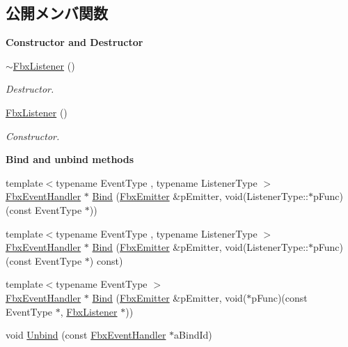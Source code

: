 \subsection*{公開メンバ関数}
\begin{Indent}\textbf{ Constructor and Destructor}\par
\begin{DoxyCompactItemize}
\item 
\hyperlink{class_fbx_listener_a47f9225b672464b671e7d260fba28fa3}{$\sim$\+Fbx\+Listener} ()
\begin{DoxyCompactList}\small\item\em Destructor. \end{DoxyCompactList}\item 
\hyperlink{class_fbx_listener_a8d0059633c0a29709abd105fb4f911ec}{Fbx\+Listener} ()
\begin{DoxyCompactList}\small\item\em Constructor. \end{DoxyCompactList}\end{DoxyCompactItemize}
\end{Indent}
\begin{Indent}\textbf{ Bind and unbind methods}\par
\begin{DoxyCompactItemize}
\item 
{\footnotesize template$<$typename Event\+Type , typename Listener\+Type $>$ }\\\hyperlink{class_fbx_event_handler}{Fbx\+Event\+Handler} $\ast$ \hyperlink{class_fbx_listener_a7a3298b1f4fa347aaa2cb5136265a178}{Bind} (\hyperlink{class_fbx_emitter}{Fbx\+Emitter} \&p\+Emitter, void(Listener\+Type\+::$\ast$p\+Func)(const Event\+Type $\ast$))
\item 
{\footnotesize template$<$typename Event\+Type , typename Listener\+Type $>$ }\\\hyperlink{class_fbx_event_handler}{Fbx\+Event\+Handler} $\ast$ \hyperlink{class_fbx_listener_a2c3413cf0a62389613102a6ed9727ed1}{Bind} (\hyperlink{class_fbx_emitter}{Fbx\+Emitter} \&p\+Emitter, void(Listener\+Type\+::$\ast$p\+Func)(const Event\+Type $\ast$) const)
\item 
{\footnotesize template$<$typename Event\+Type $>$ }\\\hyperlink{class_fbx_event_handler}{Fbx\+Event\+Handler} $\ast$ \hyperlink{class_fbx_listener_aeb47fdd2b68d0d626e3b59ee2da20255}{Bind} (\hyperlink{class_fbx_emitter}{Fbx\+Emitter} \&p\+Emitter, void($\ast$p\+Func)(const Event\+Type $\ast$, \hyperlink{class_fbx_listener}{Fbx\+Listener} $\ast$))
\item 
void \hyperlink{class_fbx_listener_a723ba6f82b533e427d72ab39da3f8aeb}{Unbind} (const \hyperlink{class_fbx_event_handler}{Fbx\+Event\+Handler} $\ast$a\+Bind\+Id)
\end{DoxyCompactItemize}
\end{Indent}


